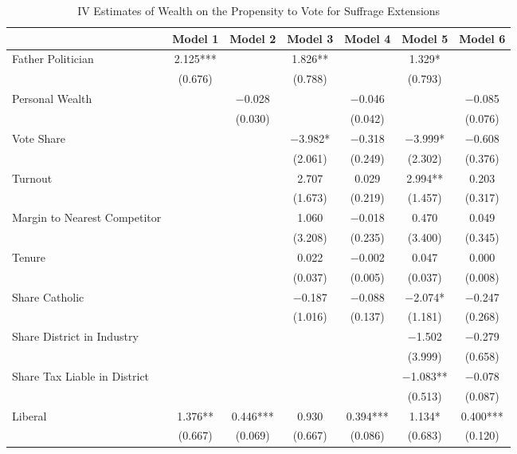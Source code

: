 \begin{table}

\caption{\label{tab:ivresults_suffrage}IV Estimates of Wealth on the Propensity to Vote for Suffrage Extensions}
\centering
\begin{tabular}[t]{lcccccc}
\toprule
  & Model 1 & Model 2 & Model 3 & Model 4 & Model 5 & Model 6\\
\midrule
Father Politician & \num{2.125}*** &  & \num{1.826}** &  & \num{1.329}* & \\
 & (\num{0.676}) &  & (\num{0.788}) &  & (\num{0.793}) & \\
Personal Wealth &  & \num{-0.028} &  & \num{-0.046} &  & \num{-0.085}\\
 &  & (\num{0.030}) &  & (\num{0.042}) &  & (\num{0.076})\\
Vote Share &  &  & \num{-3.982}* & \num{-0.318} & \num{-3.999}* & \num{-0.608}\\
 &  &  & (\num{2.061}) & (\num{0.249}) & (\num{2.302}) & (\num{0.376})\\
Turnout &  &  & \num{2.707} & \num{0.029} & \num{2.994}** & \num{0.203}\\
 &  &  & (\num{1.673}) & (\num{0.219}) & (\num{1.457}) & (\num{0.317})\\
Margin to Nearest Competitor &  &  & \num{1.060} & \num{-0.018} & \num{0.470} & \num{0.049}\\
 &  &  & (\num{3.208}) & (\num{0.235}) & (\num{3.400}) & (\num{0.345})\\
Tenure &  &  & \num{0.022} & \num{-0.002} & \num{0.047} & \num{0.000}\\
 &  &  & (\num{0.037}) & (\num{0.005}) & (\num{0.037}) & (\num{0.008})\\
Share Catholic &  &  & \num{-0.187} & \num{-0.088} & \num{-2.074}* & \num{-0.247}\\
 &  &  & (\num{1.016}) & (\num{0.137}) & (\num{1.181}) & (\num{0.268})\\
Share District in Industry &  &  &  &  & \num{-1.502} & \num{-0.279}\\
 &  &  &  &  & (\num{3.999}) & (\num{0.658})\\
Share Tax Liable in District &  &  &  &  & \num{-1.083}** & \num{-0.078}\\
 &  &  &  &  & (\num{0.513}) & (\num{0.087})\\
Liberal & \num{1.376}** & \num{0.446}*** & \num{0.930} & \num{0.394}*** & \num{1.134}* & \num{0.400}***\\
 & (\num{0.667}) & (\num{0.069}) & (\num{0.667}) & (\num{0.086}) & (\num{0.683}) & (\num{0.120})\\

\end{tabular}
\end{table}
